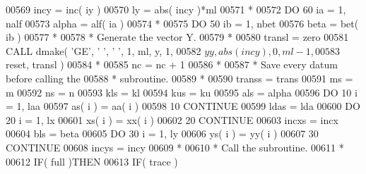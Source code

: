 \begin{DoxyCode}
00569                         incy = inc( iy )
00570                         ly = abs( incy )*ml
00571 \textcolor{comment}{*}
00572                         \textcolor{keywordflow}{DO} 60 ia = 1, nalf
00573                            alpha = alf( ia )
00574 \textcolor{comment}{*}
00575                            \textcolor{keywordflow}{DO} 50 ib = 1, nbet
00576                               beta = bet( ib )
00577 \textcolor{comment}{*}
00578 \textcolor{comment}{*                             Generate the vector Y.}
00579 \textcolor{comment}{*}
00580                               transl = zero
00581                               \textcolor{keyword}{CALL }dmake( \textcolor{stringliteral}{'GE'}, \textcolor{stringliteral}{' '}, \textcolor{stringliteral}{' '}, 1, ml, y, 1,
00582      $                                    yy, abs( incy ), 0, ml - 1,
00583      $                                    reset, transl )
00584 \textcolor{comment}{*}
00585                               nc = nc + 1
00586 \textcolor{comment}{*}
00587 \textcolor{comment}{*                             Save every datum before calling the}
00588 \textcolor{comment}{*                             subroutine.}
00589 \textcolor{comment}{*}
00590                               transs = trans
00591                               ms = m
00592                               ns = n
00593                               kls = kl
00594                               kus = ku
00595                               als = alpha
00596                               \textcolor{keywordflow}{DO} 10 i = 1, laa
00597                                  as( i ) = aa( i )
00598    10                         \textcolor{keywordflow}{CONTINUE}
00599                               ldas = lda
00600                               \textcolor{keywordflow}{DO} 20 i = 1, lx
00601                                  xs( i ) = xx( i )
00602    20                         \textcolor{keywordflow}{CONTINUE}
00603                               incxs = incx
00604                               bls = beta
00605                               \textcolor{keywordflow}{DO} 30 i = 1, ly
00606                                  ys( i ) = yy( i )
00607    30                         \textcolor{keywordflow}{CONTINUE}
00608                               incys = incy
00609 \textcolor{comment}{*}
00610 \textcolor{comment}{*                             Call the subroutine.}
00611 \textcolor{comment}{*}
00612                               \textcolor{keywordflow}{IF}( full )\textcolor{keywordflow}{THEN}
00613                                  \textcolor{keywordflow}{IF}( trace )

\end{DoxyCode}
